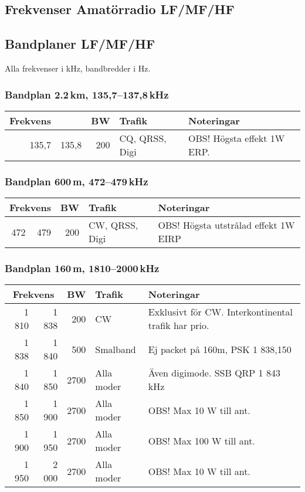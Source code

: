 \begin{landscape}
\section{Frekvenser Amatörradio LF/MF/HF}
\subsection{Bandplaner LF/MF/HF}
Alla frekvenser i kHz, bandbredder i Hz.

\subsubsection{Bandplan 2.2\,km, 135,7--137,8\,kHz}
\begin{tabular}{rrrll}
\textbf{Frekvens} &  & \textbf{BW} & \textbf{Trafik} & \textbf{Noteringar} \\ \hline
135,7 & 135,8 & 200 & CQ, QRSS, Digi & OBS! Högsta effekt 1W ERP. \\ \hline
\end{tabular}

\subsubsection{Bandplan 600\,m, 472--479\,kHz}
\begin{tabular}{rrrll}
\multicolumn{2}{c}{\textbf{Frekvens}} & \textbf{BW} & \textbf{Trafik} & \textbf{Noteringar} \\ \hline
472 & 479 & 200 & CW, QRSS, Digi & OBS! Högsta utstrålad effekt 1W EIRP \\ \hline
\end{tabular}

\subsubsection{Bandplan 160\,m, 1810--2000\,kHz}
\begin{tabular}{rrrll}
\multicolumn{2}{c}{\textbf{Frekvens}} & \textbf{BW} & \textbf{Trafik} & \textbf{Noteringar} \\ \hline
1 810 & 1 838 & 200  & CW         & Exklusivt för CW. Interkontinental trafik har prio. \\ \hline
1 838 & 1 840 & 500  & Smalband   & Ej packet på 160m, PSK 1 838,150                    \\ \hline
1 840 & 1 850 & 2700 & Alla moder & Även digimode. SSB QRP 1 843 kHz                    \\ \hline
1 850 & 1 900 & 2700 & Alla moder & OBS! Max 10 W till ant.                             \\ \hline
1 900 & 1 950 & 2700 & Alla moder & OBS! Max 100 W till ant.                            \\ \hline
1 950 & 2 000 & 2700 & Alla moder & OBS! Max 10 W till ant.                             \\ \hline
\end{tabular}


\end{landscape}
